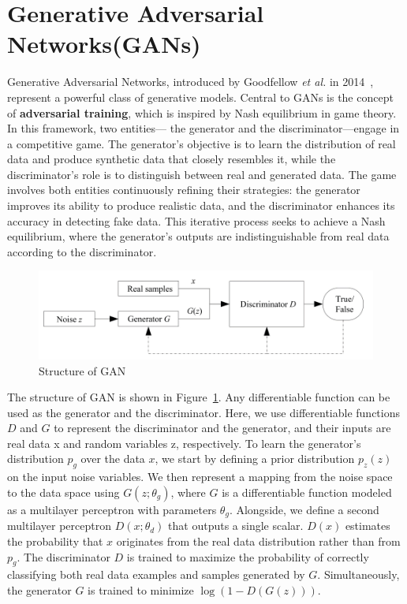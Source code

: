 \documentclass[12pt,DIV14,BCOR12mm,a4paper,footinclude=false,headinclude,parskip=half-,twoside,openright,cleardoublepage=empty,toc=index,bibliography=totoc,listof=totoc]{scrreprt}
\numberwithin{equation}{chapter}
\begin{document}
\section{Generative Adversarial Networks(GANs)}
\label{sec:GANs_theory}
Generative Adversarial Networks, introduced by Goodfellow \textit{et al.} in 2014~\cite{goodfellow2014generative}, represent a powerful class of generative models. Central to GANs is the concept of \textbf{adversarial training}, which is inspired by Nash equilibrium in game theory. In this framework, two entities— the generator and the discriminator—engage in a competitive game. The generator's objective is to learn the distribution of real data and produce synthetic data that closely resembles it, while the discriminator's role is to distinguish between real and generated data. The game involves both entities continuously refining their strategies: the generator improves its ability to produce realistic data, and the discriminator enhances its accuracy in detecting fake data. This iterative process seeks to achieve a Nash equilibrium, where the generator's outputs are indistinguishable from real data according to the discriminator.
\begin{figure}
	\centering
	\includegraphics[scale=1.1]{../media/Structure of GAN.PNG}
	\caption{Structure of GAN\cite{wang2017generative}}
	\label{GAN_struct}
\end{figure}
The structure of GAN is shown in Figure~\ref{GAN_struct}. Any differentiable function can be used as the generator and the discriminator. Here, we use differentiable functions \( D \) and \( G \) to represent the discriminator and the generator, and their inputs are real data x and random variables z, respectively. To learn the generator's distribution \( p_g\) over the data \( x \), we start by defining a prior distribution \( p_z(z) \) on the input noise variables. We then represent a mapping from the noise space to the data space using \( G(z; \theta_g) \), where \( G \) is a differentiable function modeled as a multilayer perceptron with parameters \( \theta_g \). Alongside, we define a second multilayer perceptron \( D(x; \theta_d) \) that outputs a single scalar. \( D(x) \) estimates the probability that \( x \) originates from the real data distribution rather than from \( p_g \). The discriminator \( D \) is trained to maximize the probability of correctly classifying both real data examples and samples generated by \( G \). Simultaneously, the generator \( G \) is trained to minimize \( \log(1 - D(G(z))) \). 
\end{document}

